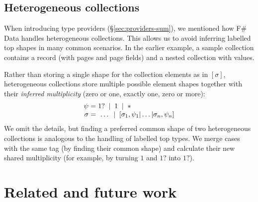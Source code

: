 \documentclass[10pt,preprint,clearpagebib]{sigplanconf}
\newcommand{\strf}[1]{\textnormal{\textcolor{strclr}{\sffamily #1}}}
\newcommand{\lsep}[0]{\;\; | \;\;}
\newcommand{\narrow}[1]{\hspace{-0.7em} #1 \hspace{-0.7em}}
\begin{document}

\subsection{Heterogeneous collections} 
\label{sec:impl-hetero}

When introducing type providers (\S\ref{sec:providers-sum}), we mentioned how F\# Data 
handles heterogeneous collections. This allows us to avoid inferring 
labelled top shapes in many common scenarios. In the earlier example, a sample collection 
contains a record (with \strf{pages} and \strf{page} fields) and a nested collection with values.

Rather than storing a single shape for the collection elements as in $[\sigma]$, heterogeneous
collections store multiple possible element shapes together with their \emph{  inferred multiplicity} 
(zero or one, exactly one, zero or more):
%
\begin{equation*}
\begin{array}{rcl}
 \psi &\narrow{=}& 1? \lsep 1 \lsep \ast \\
 \sigma &\narrow{=}& ~\ldots \lsep [\sigma_1, \psi_1 | \ldots | \sigma_n, \psi_n ]
\end{array}
\end{equation*}
%
We omit the details, but finding a preferred common shape of two heterogeneous 
collections is analogous to the handling of labelled top types. We merge cases with the same tag (by finding 
their common shape) and calculate their new shared multiplicity (for example, by turning 
$1$ and $1?$ into $1?$).



%
%

\section{Related and future work}
\label{sec:related}
\end{document}
